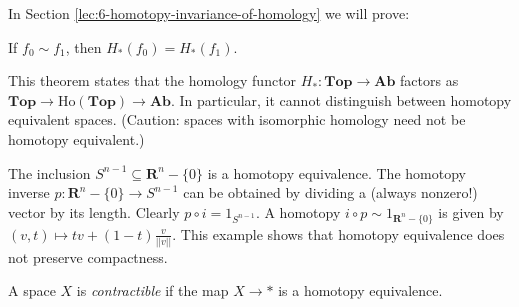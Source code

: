 In Section \ref{lec:6-homotopy-invariance-of-homology} we will prove:
\begin{theorem}
	If $f_0\sim f_1$, then $ H_\ast(f_0)= H_\ast(f_1)$.
\end{theorem}
This theorem states that the homology functor $H_\ast:\mathbf{Top}\to\mathbf{Ab}$ factors as $\mathbf{Top}\to\mathrm{Ho}(\mathbf{Top})\to\mathbf{Ab}$. In particular, it cannot distinguish between homotopy equivalent spaces. (Caution: spaces with isomorphic homology need not be homotopy equivalent.)
\begin{example}\label{exa:homotopy-equivalence-sphere}
The inclusion $S^{n-1}\subseteq \mathbf{R}^n-\{0\}$ is a homotopy equivalence. The homotopy inverse $p:\mathbf{R}^n-\{0\}\to S^{n-1}$ can be obtained by dividing a (always nonzero!) vector by its length. Clearly $p\circ i=1_{S^{n-1}}$. A homotopy $i\circ p\sim 1_{\mathbf{R}^n-\{0\}}$ is given by $(v,t)\mapsto tv+(1-t)\frac{v}{||v||}$. This example shows that homotopy equivalence does not preserve compactness.
\end{example}
\begin{definition}
A space $X$ is \emph{contractible} if the map $X\to\ast$ is a homotopy equivalence.
\end{definition}


